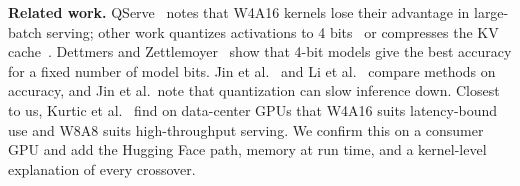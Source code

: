 \textbf{Related work.} QServe~\cite{lin2025qserve} notes that W4A16 kernels lose their advantage in
large-batch serving; other work quantizes activations to 4 bits~\cite{ashkboos2024quarot} or
compresses the KV cache~\cite{liu2024kivi,hooper2024kvquant}. Dettmers and
Zettlemoyer~\cite{dettmers2023case} show that 4-bit models give the best accuracy for a fixed number
of model bits. Jin et al.~\cite{jin2024comprehensive} and Li et al.~\cite{li2024evaluating} compare
methods on accuracy, and Jin et al.\ note that quantization can slow inference down. Closest to us,
Kurtic et al.~\cite{kurtic2024give} find on data-center GPUs that W4A16 suits latency-bound use and
W8A8 suits high-throughput serving. We confirm this on a consumer GPU and add the Hugging Face path,
memory at run time, and a kernel-level explanation of every crossover.
